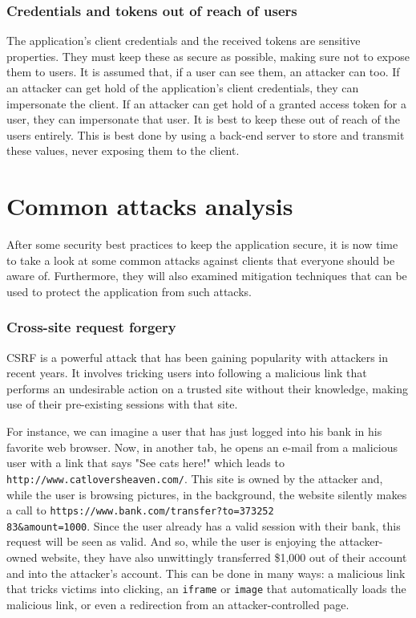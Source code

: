 \subsubsection{Credentials and tokens out of reach of users}
The application's client credentials and the received tokens are sensitive properties. They must keep these as secure as possible, making sure not to expose them to users. It is assumed that, if a user can see them, an attacker can too. If an attacker can get hold of the application's client credentials, they can impersonate the client. If an attacker can get hold of a granted access token for a user, they can impersonate that user. It is best to keep these out of reach of the users entirely. This is best done by using a back-end server to store and transmit these values, never exposing them to the client.

\section{Common attacks analysis}
After some security best practices to keep the application secure, it is now time to take a look at some common attacks against \textit{\oauth} clients that everyone should be aware of. Furthermore, they will also examined mitigation techniques that can be used to protect the application from such attacks.

\subsubsection{Cross-site request forgery}
\label{csrf}
CSRF is a powerful attack that has been gaining popularity with attackers in recent years. It involves tricking users into following a malicious link that performs an undesirable action on a trusted site without their knowledge, making use of their pre-existing sessions with that site.

For instance, we can imagine a user that has just logged into his bank in his favorite web browser. Now, in another tab, he opens an e-mail from a malicious user with a link that says "See cats here!" which leads to \texttt{http://www.catloversheaven.com/}.
This site is owned by the attacker and, while the user is browsing pictures, in the background, the website silently makes a call to \texttt{https://www.bank.com/transfer?to=373252 \\ 83\&amount=1000}.
Since the user already has a valid session with their bank, this request will be seen as valid. And so, while the user is enjoying the attacker-owned website, they have also unwittingly transferred \$1,000 out of their account and into the
attacker's account. This can be done in many ways: a malicious link that tricks victims into clicking, an \texttt{iframe} or \texttt{image} that automatically loads the malicious link, or even a redirection from an attacker-controlled page.

